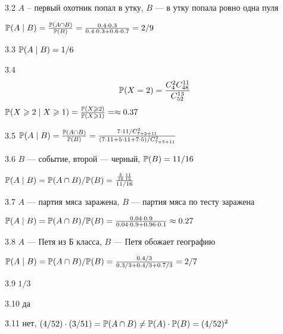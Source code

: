 \protect \hypertarget {soln:3.2}{}
\begin{solution}{{3.2}}
  $A$ -- первый охотник попал в утку, $B$ — в утку попала ровно одна пуля

  $\P(A \mid B)=\frac{\P(A \cap B)}{\P(B)}= \frac{0.4 \cdot 0.3 }{0.4\cdot 0.3 + 0.6\cdot 0.7}=2/9$
\end{solution}
\protect \hypertarget {soln:3.3}{}
\begin{solution}{{3.3}}
  $\P(A \mid B)=1/6$
\end{solution}
\protect \hypertarget {soln:3.4}{}
\begin{solution}{{3.4}}
\[
\P(X = 2) = \frac{C_4^2 C_{48}^{11}}{C_{52}^{13}}
\]
$\P(X\geq 2 \mid X\geq 1)=\frac{\P(X \geq 2)}{\P(X \geq 1)}= \approx 0.37$
\end{solution}
\protect \hypertarget {soln:3.5}{}
\begin{solution}{{3.5}}
  $\P(A \mid B)=\frac{\P(A \cap B)}{\P(B)}= \frac{7\cdot 11 /C_{7+5+11}^2}{(7\cdot 11+5\cdot 11 + 7\cdot 5) /C_{7+5+11}^2 }$
\end{solution}
\protect \hypertarget {soln:3.6}{}
\begin{solution}{{3.6}}
  $B$ — событие, второй — черный, $\P(B)=11/16$

  $\P(A \mid B)=\P(A \cap B)/\P(B)=\frac{\frac{5}{16}\frac{11}{15}}{11/16}$
\end{solution}
\protect \hypertarget {soln:3.7}{}
\begin{solution}{{3.7}}
  $A$ — партия мяса заражена, $B$ — партия мяса по тесту заражена

  $\P(A \mid B)=\P(A \cap B)/\P(B)=\frac{0.04\cdot 0.9}{0.04\cdot 0.9+0.96\cdot 0.1}\approx 0.27$
\end{solution}
\protect \hypertarget {soln:3.8}{}
\begin{solution}{{3.8}}
  $A$ — Петя из Б класса, $B$ — Петя обожает географию

  $\P(A \mid B)=\P(A \cap B)/\P(B)=\frac{0.4/3}{0.3/3+0.4/3+0.7/3}=2/7$
\end{solution}
\protect \hypertarget {soln:3.9}{}
\begin{solution}{{3.9}}
  $1/3$
\end{solution}
\protect \hypertarget {soln:3.10}{}
\begin{solution}{{3.10}}
  да
\end{solution}
\protect \hypertarget {soln:3.11}{}
\begin{solution}{{3.11}}
  нет, $(4/52)\cdot (3/51)=\P(A\cap B) \neq \P(A)\cdot \P(B)=(4/52)^2$
\end{solution}
